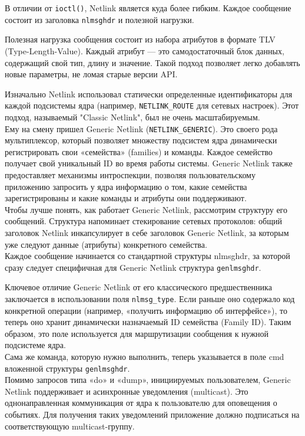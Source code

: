 В отличии от \texttt{ioctl()}, Netlink является куда более гибким.
Каждое сообщение состоит из заголовка \texttt{nlmsghdr} и полезной нагрузки.



Полезная нагрузка сообщения состоит из набора атрибутов в формате TLV (Type-Length-Value).
Каждый атрибут — это самодостаточный блок данных, содержащий свой тип, длину и значение. Такой подход позволяет легко добавлять новые параметры, не ломая старые версии API.

Изначально Netlink использовал статически определенные идентификаторы для каждой подсистемы ядра (например, \texttt{NETLINK_ROUTE} для сетевых настроек).
Этот подход, называемый "Classic Netlink", был не очень масштабируемым.\\

Ему на смену пришел Generic Netlink (\texttt{NETLINK_GENERIC}).
Это своего рода мультиплексор, который позволяет множеству подсистем ядра динамически регистрировать свои «семейства» (families) и команды.
Каждое семейство получает свой уникальный ID во время работы системы.
Generic Netlink также предоставляет механизмы интроспекции, позволяя пользовательскому приложению запросить у ядра информацию о том, какие семейства зарегистрированы и какие команды и атрибуты они поддерживают.\\

Чтобы лучше понять, как работает Generic Netlink, рассмотрим структуру его сообщений.
Структура напоминает стекирование сетевых протоколов: общий заголовок Netlink инкапсулирует в себе заголовок Generic Netlink, за которым уже следуют данные (атрибуты) конкретного семейства.\\

Каждое сообщение начинается со стандартной структуры nlmsghdr, за которой сразу следует специфичная для Generic Netlink структура \texttt{genlmsghdr}.



Ключевое отличие Generic Netlink от его классического предшественника заключается в использовании поля \texttt{nlmsg_type}.
Если раньше оно содержало код конкретной операции (например, «получить информацию об интерфейсе»), то теперь оно хранит динамически назначаемый ID семейства (Family ID).
Таким образом, это поле используется для маршрутизации сообщения к нужной подсистеме ядра. \\

Сама же команда, которую нужно выполнить, теперь указывается в поле cmd вложенной структуры \texttt{genlmsghdr}. \\

Помимо запросов типа «do» и «dump», инициируемых пользователем, Generic Netlink поддерживает и асинхронные уведомления (multicast).
Это однонаправленная коммуникация от ядра к пользователю для оповещения о событиях. Для получения таких уведомлений приложение должно подписаться на соответствующую multicast-группу. \\
